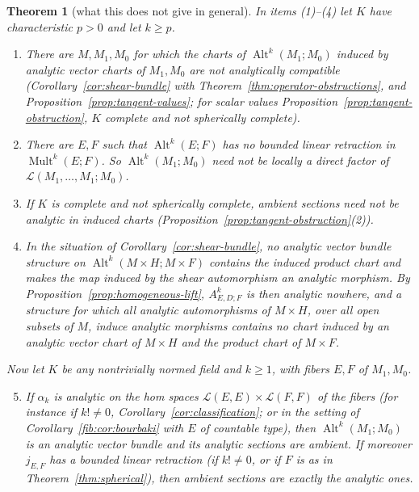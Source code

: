 \documentclass[11pt]{amsart}
\newtheorem{theorem}{Theorem}[section]
\theoremstyle{definition}
\theoremstyle{remark}
\numberwithin{equation}{section}
\newcommand{\cL}{\mathcal L}
\newcommand{\Alt}{\operatorname{Alt}}
\newcommand{\Mult}{\operatorname{Mult}}
\theoremstyle{plain}
\theoremstyle{definition}
\theoremstyle{plain}
\begin{document}
\begin{theorem}[what this does not give in general]\label{amb:thm:limits}
In items \textup{(1)}--\textup{(4)} let $K$ have characteristic $p>0$ and let $k\ge p$.
\begin{enumerate}
\item There are $M,M_1,M_0$ for which the charts of $\Alt^k(M_1;M_0)$ induced by analytic vector charts of $M_1,M_0$ are not analytically compatible (Corollary~\ref{cor:shear-bundle} with Theorem~\ref{thm:operator-obstructions}, and Proposition~\ref{prop:tangent-values}; for scalar values Proposition~\ref{prop:tangent-obstruction}, $K$ complete and not spherically complete).
\item There are $E,F$ such that $\Alt^k(E;F)$ has no bounded linear retraction in $\Mult^k(E;F)$. So $\Alt^k(M_1;M_0)$ need not be locally a direct factor of $\cL(M_1,\dots,M_1;M_0)$.
\item If $K$ is complete and not spherically complete, ambient sections need not be analytic in induced charts (Proposition~\ref{prop:tangent-obstruction}(2)).
\item In the situation of Corollary~\ref{cor:shear-bundle}, no analytic vector bundle structure on $\Alt^k(M\times H;M\times F)$ contains the induced product chart and makes the map induced by the shear automorphism an analytic morphism. By Proposition~\ref{prop:homogeneous-lift}, $A^k_{E,D;F}$ is then analytic nowhere, and a structure for which all analytic automorphisms of $M\times H$, over all open subsets of $M$, induce analytic morphisms contains no chart induced by an analytic vector chart of $M\times H$ and the product chart of $M\times F$.
\end{enumerate}
Now let $K$ be any nontrivially normed field and $k\ge1$, with fibers $E,F$ of $M_1,M_0$.
\begin{enumerate}\setcounter{enumi}{4}
\item If $\alpha_k$ is analytic on the hom spaces $\cL(E,E)\times\cL(F,F)$ of the fibers (for instance if $k!\ne0$, Corollary~\ref{cor:classification}; or in the setting of Corollary~\ref{fib:cor:bourbaki} with $E$ of countable type), then $\Alt^k(M_1;M_0)$ is an analytic vector bundle and its analytic sections are ambient. If moreover $j_{E,F}$ has a bounded linear retraction (if $k!\ne0$, or if $F$ is as in Theorem~\ref{thm:spherical}), then ambient sections are exactly the analytic ones.
\end{enumerate}
\end{theorem}
\end{document}

